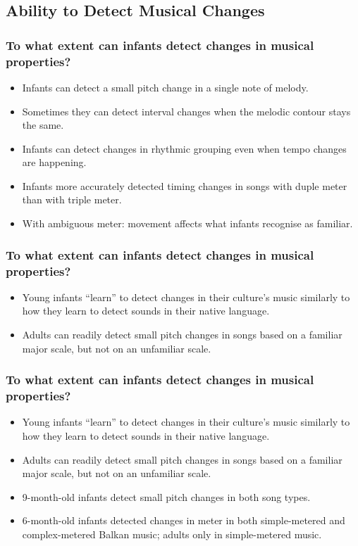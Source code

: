 \documentclass{beamer}
\begin{document}
\subsection*{Ability to Detect Musical Changes}

\begin{frame}
	\frametitle{To what extent can infants detect changes in musical properties?}
	\begin{itemize}
		\item Infants can detect a small pitch change in a single note of melody.
		\item Sometimes they can detect interval changes when the melodic contour stays the same.
		\item Infants can detect changes in rhythmic grouping even when tempo changes are happening.
		\item Infants more accurately detected timing changes in songs with duple meter than with triple meter.
		\item With ambiguous meter: movement affects what infants recognise as familiar.
	\end{itemize}
\end{frame}

\begin{frame}
	\frametitle{To what extent can infants detect changes in musical properties?}
	\begin{itemize}
		\item Young infants ``learn'' to detect changes in their culture's music similarly to how they learn to detect sounds in their native language.
		\item Adults can readily detect small pitch changes in songs based on a familiar major scale, but not on an unfamiliar scale.
	\end{itemize}
\end{frame}

\begin{frame}
	\frametitle{To what extent can infants detect changes in musical properties?}
	\begin{itemize}
		\item Young infants ``learn'' to detect changes in their culture's music similarly to how they learn to detect sounds in their native language.
		\item Adults can readily detect small pitch changes in songs based on a familiar major scale, but not on an unfamiliar scale.
		\item 9-month-old infants detect small pitch changes in both song types.
		\item 6-month-old infants detected changes in meter in both simple-metered and complex-metered Balkan music; adults only in simple-metered music.
	\end{itemize}
\end{frame}
\end{document}
